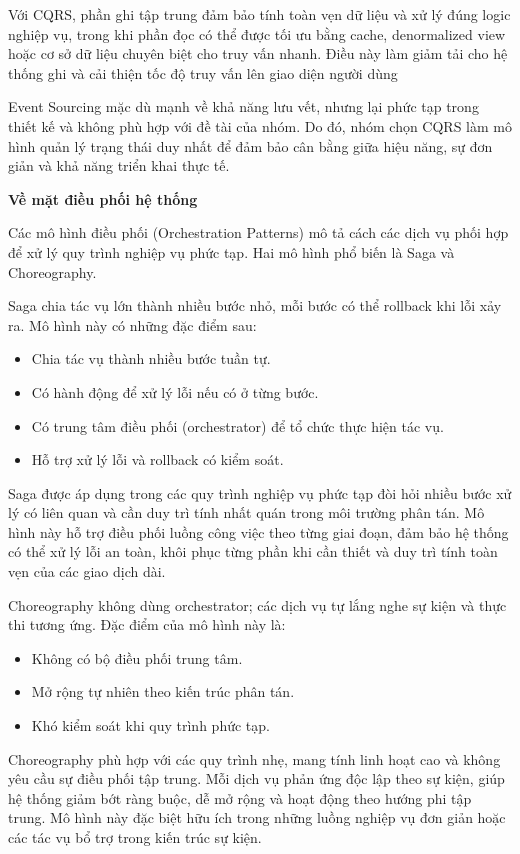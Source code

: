 Với CQRS, phần ghi tập trung đảm bảo tính toàn vẹn dữ liệu và xử lý đúng logic nghiệp vụ, trong khi phần đọc có thể được tối ưu bằng cache, denormalized view hoặc cơ sở dữ liệu chuyên biệt cho truy vấn nhanh. Điều này làm giảm tải cho hệ thống ghi và cải thiện tốc độ truy vấn lên giao diện người dùng

Event Sourcing mặc dù mạnh về khả năng lưu vết, nhưng lại phức tạp trong thiết kế và không phù hợp với đề tài của nhóm. Do đó, nhóm chọn CQRS làm mô hình quản lý trạng thái duy nhất để đảm bảo cân bằng giữa hiệu năng, sự đơn giản và khả năng triển khai thực tế.
\bigskip






\textbf{Về mặt điều phối hệ thống}

Các mô hình điều phối (Orchestration Patterns) mô tả cách các dịch vụ phối hợp để xử lý quy trình nghiệp vụ phức tạp. Hai mô hình phổ biến là Saga và Choreography.

Saga chia tác vụ lớn thành nhiều bước nhỏ, mỗi bước có thể rollback khi lỗi xảy ra. Mô hình này có những đặc điểm sau:
\begin{itemize}
    \item Chia tác vụ thành nhiều bước tuần tự.
    \item Có hành động để xử lý lỗi nếu có ở từng bước\cite{c4-eda}.
    \item Có trung tâm điều phối (orchestrator) để tổ chức thực hiện tác vụ\cite{c4-eda}.
    \item Hỗ trợ xử lý lỗi và rollback có kiểm soát.
\end{itemize}
Saga được áp dụng trong các quy trình nghiệp vụ phức tạp đòi hỏi nhiều bước xử lý có liên quan và cần duy trì tính nhất quán trong môi trường phân tán. Mô hình này hỗ trợ điều phối luồng công việc theo từng giai đoạn, đảm bảo hệ thống có thể xử lý lỗi an toàn, khôi phục từng phần khi cần thiết và duy trì tính toàn vẹn của các giao dịch dài.

Choreography không dùng orchestrator; các dịch vụ tự lắng nghe sự kiện và thực thi tương ứng. Đặc điểm của mô hình này là:
\begin{itemize}
    \item Không có bộ điều phối trung tâm\cite{c4-eda}.
    \item Mở rộng tự nhiên theo kiến trúc phân tán.
    \item Khó kiểm soát khi quy trình phức tạp\cite{c4-eda}.
\end{itemize}
Choreography phù hợp với các quy trình nhẹ, mang tính linh hoạt cao và không yêu cầu sự điều phối tập trung. Mỗi dịch vụ phản ứng độc lập theo sự kiện, giúp hệ thống giảm bớt ràng buộc, dễ mở rộng và hoạt động theo hướng phi tập trung. Mô hình này đặc biệt hữu ích trong những luồng nghiệp vụ đơn giản hoặc các tác vụ bổ trợ trong kiến trúc sự kiện.

